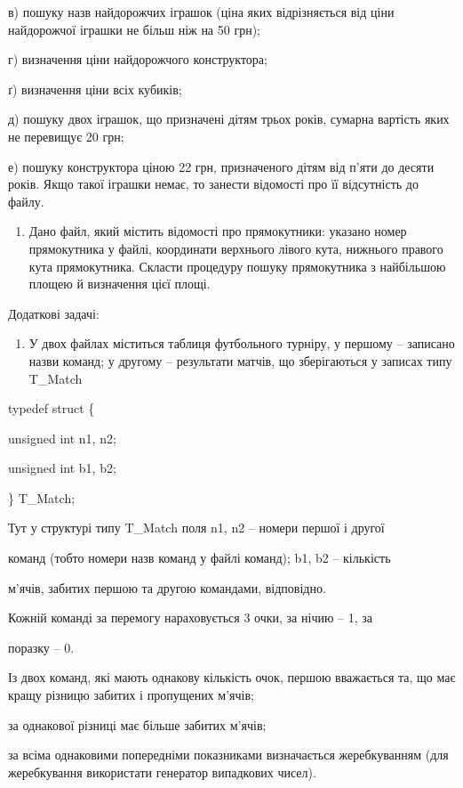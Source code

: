 \documentclass[]{article}
\begin{document}
в) пошуку назв найдорожчих іграшок (ціна яких відрізняється від ціни
найдорожчої іграшки не більш ніж на 50 грн);

г) визначення ціни найдорожчого конструктора;

ґ) визначення ціни всіх кубиків;

д) пошуку двох іграшок, що призначені дітям трьох років, сумарна
вартість яких не перевищує 20 грн;

е) пошуку конструктора ціною 22 грн, призначеного дітям від п'яти до
десяти років. Якщо такої іграшки немає, то занести відомості про її
відсутність до файлу.

\begin{enumerate}
\def\labelenumi{\arabic{enumi})}
\item
  Дано файл, який містить відомості про прямокутники: указано номер
  прямокутника у файлі, координати верхнього лівого кута, нижнього
  правого кута прямокутника. Скласти процедуру пошуку прямокутника з
  найбільшою площею й визначення цієї площі.
\end{enumerate}

Додаткові задачі:

\begin{enumerate}
\def\labelenumi{\arabic{enumi})}
\item
  У двох файлах міститься таблиця футбольного турніру, у першому --
  записано назви команд; у другому -- результати матчів, що зберігаються
  у записах типу T\_Match
\end{enumerate}

typedef struct \{

unsigned int n1, n2;

unsigned int b1, b2;

\} T\_Match;

Тут у структурі типу T\_Match поля n1, n2 -- номери першої і другої

команд (тобто номери назв команд у файлі команд); b1, b2 -- кількість

м'ячів, забитих першою та другою командами, відповідно.

Кожній команді за перемогу нараховується 3 очки, за нічию -- 1, за

поразку -- 0.

Із двох команд, які мають однакову кількість очок, першою вважається та,
що має кращу різницю забитих і пропущених м'ячів;

за однакової різниці має більше забитих м'ячів;

за всіма однаковими попередніми показниками визначається жеребкуванням
(для жеребкування використати генератор випадкових чисел).
\end{document}
